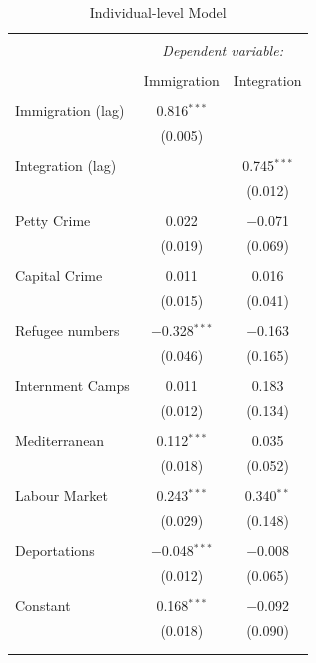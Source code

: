 \documentclass{article}
\begin{document}
\begin{table}[!htbp] \centering 
  \caption{Individual-level Model} 
  \label{tab:ind_model} 
\begin{tabular}{@{\extracolsep{5pt}}lcc} 
\\[-1.8ex]\hline 
\hline \\[-1.8ex] 
 & \multicolumn{2}{c}{\textit{Dependent variable:}} \\ 
\cline{2-3} 
\\[-1.8ex] & Immigration & Integration \\ 
\hline \\[-1.8ex] 
 Immigration (lag) & 0.816$^{***}$ &  \\ 
  & (0.005) &  \\ 
  & & \\ 
 Integration (lag) &  & 0.745$^{***}$ \\ 
  &  & (0.012) \\ 
  & & \\ 
 Petty Crime & 0.022 & $-$0.071 \\ 
  & (0.019) & (0.069) \\ 
  & & \\ 
 Capital Crime& 0.011 & 0.016 \\ 
  & (0.015) & (0.041) \\ 
  & & \\ 
 Refugee numbers & $-$0.328$^{***}$ & $-$0.163 \\ 
  & (0.046) & (0.165) \\ 
  & & \\ 
 Internment Camps & 0.011 & 0.183 \\ 
  & (0.012) & (0.134) \\ 
  & & \\ 
 Mediterranean & 0.112$^{***}$ & 0.035 \\ 
  & (0.018) & (0.052) \\ 
  & & \\ 
 Labour Market & 0.243$^{***}$ & 0.340$^{**}$ \\ 
  & (0.029) & (0.148) \\ 
  & & \\ 
 Deportations & $-$0.048$^{***}$ & $-$0.008 \\ 
  & (0.012) & (0.065) \\ 
  & & \\ 
 Constant & 0.168$^{***}$ & $-$0.092 \\ 
  & (0.018) & (0.090) \\ 
  & & \\ 
\hline \\[-1.8ex] 

\end{tabular}
\end{table}
\end{document}

